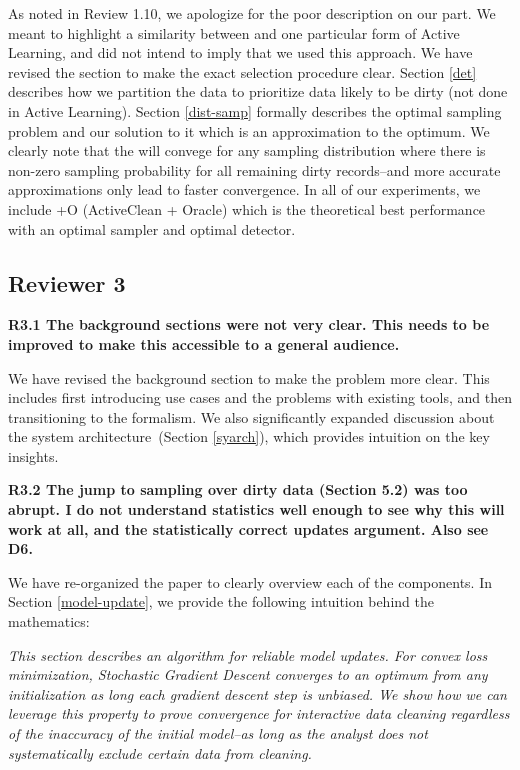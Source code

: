 \noindent  As noted in Review 1.10, we apologize for the poor description on our part. We meant to highlight a similarity between \sys and one particular form of Active Learning, and did not intend to imply that we used this approach. 
We have revised the section to make the exact selection procedure clear. Section \ref{det} describes how we partition the data to prioritize data likely to be dirty (not done in Active Learning). Section \ref{dist-samp} formally describes the optimal sampling problem and our solution to it which is an approximation to the optimum. We clearly note that the \sys will convege for any sampling distribution where there is non-zero sampling probability for all remaining dirty records--and more accurate approximations only lead to faster convergence. In all of our experiments, we include \sys+O (ActiveClean + Oracle) which is the theoretical best performance with an optimal sampler and optimal detector.

 \subsection*{Reviewer 3}

\noindent\textbf{R3.1 The background sections were not very clear. This needs to be improved
to make this accessible to a general audience.}

\noindent  We have revised the background section to make the problem more clear. This includes first introducing use cases and the problems with existing tools, and then transitioning to the formalism. We also significantly expanded discussion about the system architecture~(Section \ref{syarch}), which provides intuition on the key insights.

\vspace{0.5em}

\noindent\textbf{R3.2 The jump to sampling over dirty data (Section 5.2) was too abrupt.
I do not understand statistics well enough to see why this will work at all,
and the statistically correct updates argument. Also see D6.}

\noindent  We have re-organized the paper to clearly overview each of the components. In Section \ref{model-update}, we provide the following intuition behind the mathematics:

\emph{This section describes an algorithm for reliable model updates.
For convex loss minimization, Stochastic Gradient Descent converges to an optimum from any initialization as long each gradient descent step is unbiased.
We show how we can leverage this property to prove convergence for interactive data cleaning regardless of the inaccuracy of the initial model--as long as the analyst does not systematically exclude certain data from cleaning.} 

